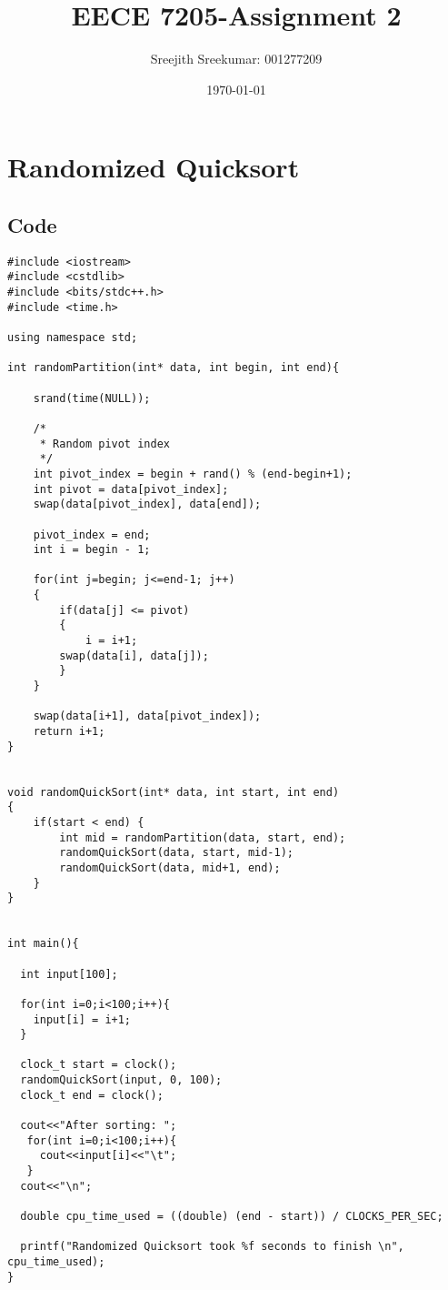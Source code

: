 \documentclass{article}
\title{EECE 7205-Assignment 2}
\author{Sreejith Sreekumar: 001277209}
\date{\today}
\begin{document}
\maketitle

\section{Randomized Quicksort}

\subsection{Code}

\begin{verbatim}
#include <iostream>
#include <cstdlib>
#include <bits/stdc++.h>
#include <time.h>

using namespace std;

int randomPartition(int* data, int begin, int end){
  
    srand(time(NULL));

    /*
     * Random pivot index
     */
    int pivot_index = begin + rand() % (end-begin+1);
    int pivot = data[pivot_index];
    swap(data[pivot_index], data[end]);
    
    pivot_index = end;
    int i = begin - 1;
 
    for(int j=begin; j<=end-1; j++)
    {
        if(data[j] <= pivot)
        {
            i = i+1;
	    swap(data[i], data[j]);
        }
    }
 
    swap(data[i+1], data[pivot_index]);
    return i+1;
}

 
void randomQuickSort(int* data, int start, int end)
{
    if(start < end) {
        int mid = randomPartition(data, start, end);
        randomQuickSort(data, start, mid-1);
        randomQuickSort(data, mid+1, end);
    }
}


int main(){
  
  int input[100];

  for(int i=0;i<100;i++){
    input[i] = i+1;
  }

  clock_t start = clock();
  randomQuickSort(input, 0, 100);
  clock_t end = clock();    

  cout<<"After sorting: ";
   for(int i=0;i<100;i++){
     cout<<input[i]<<"\t";
   }
  cout<<"\n";

  double cpu_time_used = ((double) (end - start)) / CLOCKS_PER_SEC;

  printf("Randomized Quicksort took %f seconds to finish \n", cpu_time_used);
}
\end{verbatim}
\end{document}
